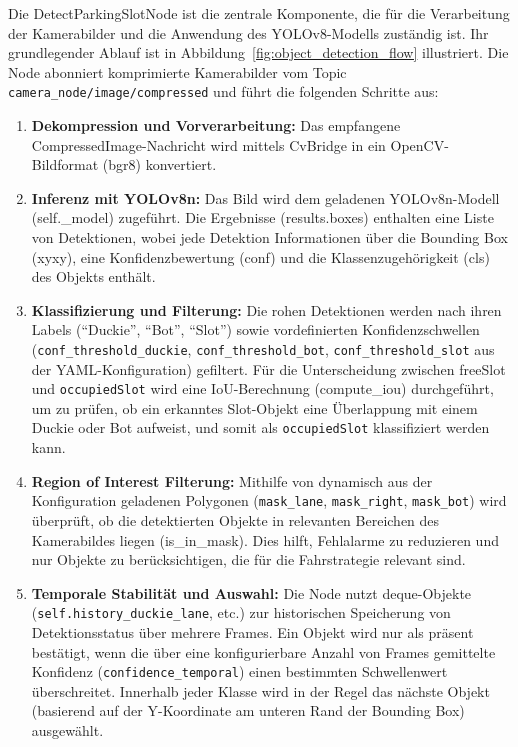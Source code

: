 Die DetectParkingSlotNode ist die zentrale Komponente, die für die Verarbeitung der Kamerabilder und die Anwendung des YOLOv8-Modells zuständig ist. Ihr grundlegender Ablauf ist in Abbildung~\ref{fig:object_detection_flow} illustriert. Die Node abonniert komprimierte Kamerabilder vom Topic \texttt{camera\_node/image/compressed} und führt die folgenden Schritte aus:
\begin{enumerate}
    \item \textbf{Dekompression und Vorverarbeitung:} Das empfangene CompressedImage-Nachricht wird mittels CvBridge in ein OpenCV-Bildformat (bgr8) konvertiert.
    \item \textbf{Inferenz mit YOLOv8n:} Das Bild wird dem geladenen YOLOv8n-Modell (self.\_model) zugeführt. Die Ergebnisse (results.boxes) enthalten eine Liste von Detektionen, wobei jede Detektion Informationen über die Bounding Box (xyxy), eine Konfidenzbewertung (conf) und die Klassenzugehörigkeit (cls) des Objekts enthält.
    \newpage
    \item \textbf{Klassifizierung und Filterung:} Die rohen Detektionen werden nach ihren Labels (\enquote{Duckie}, \enquote{Bot}, \enquote{Slot}) sowie vordefinierten Konfidenzschwellen (\texttt{conf\_threshold\_duckie}, \texttt{conf\_threshold\_bot}, \texttt{conf\_threshold\_slot} aus der YAML-Konfiguration) gefiltert. Für die Unterscheidung zwischen freeSlot und \texttt{occupiedSlot} wird eine \ac{IoU}-Berechnung (compute\_iou) durchgeführt, um zu prüfen, ob ein erkanntes Slot-Objekt eine Überlappung mit einem Duckie oder Bot aufweist, und somit als \texttt{occupiedSlot} klassifiziert werden kann.
    \item \textbf{Region of Interest Filterung:} Mithilfe von dynamisch aus der Konfiguration geladenen Polygonen (\texttt{mask\_lane}, \texttt{mask\_right}, \texttt{mask\_bot}) wird überprüft, ob die detektierten Objekte in relevanten Bereichen des Kamerabildes liegen (is\_in\_mask). Dies hilft, Fehlalarme zu reduzieren und nur Objekte zu berücksichtigen, die für die Fahrstrategie relevant sind.
    \item \textbf{Temporale Stabilität und Auswahl:} Die Node nutzt deque-Objekte (\texttt{self.history\_duckie\_lane}, etc.) zur historischen Speicherung von Detektionsstatus über mehrere Frames. Ein Objekt wird nur als präsent bestätigt, wenn die über eine konfigurierbare Anzahl von Frames gemittelte Konfidenz (\texttt{confidence\_temporal}) einen bestimmten Schwellenwert überschreitet. Innerhalb jeder Klasse wird in der Regel das nächste Objekt (basierend auf der Y-Koordinate am unteren Rand der Bounding Box) ausgewählt.

\end{enumerate}
